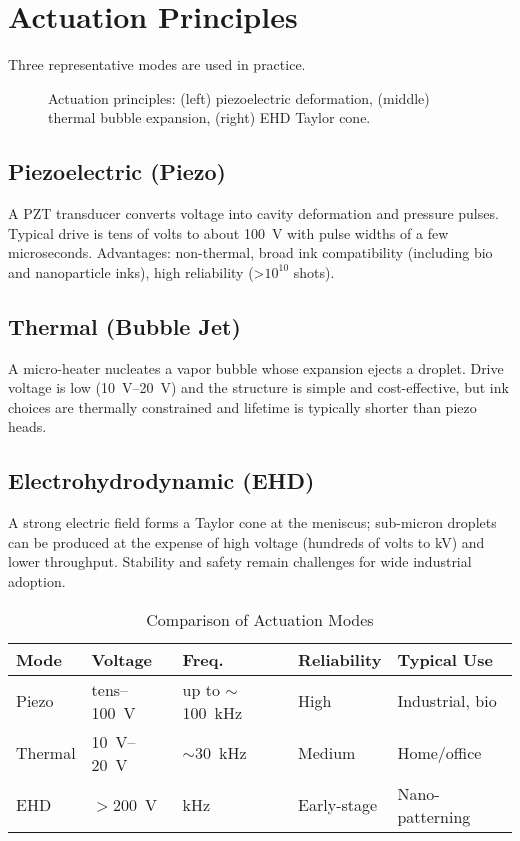 \documentclass[conference]{IEEEtran}
\begin{document}
\section{Actuation Principles}
Three representative modes are used in practice.

\begin{figure}[!t]
  \centering
  
  \caption{Actuation principles: (left) piezoelectric deformation, (middle) thermal bubble expansion, (right) EHD Taylor cone.}
  \label{fig:actuation_modes}
\end{figure}

\subsection{Piezoelectric (Piezo)}
A PZT transducer converts voltage into cavity deformation and pressure pulses. Typical drive is tens of volts to about \SI{100}{V} with pulse widths of a few microseconds. Advantages: non-thermal, broad ink compatibility (including bio and nanoparticle inks), high reliability (>$10^{10}$ shots).

\subsection{Thermal (Bubble Jet)}
A micro-heater nucleates a vapor bubble whose expansion ejects a droplet. Drive voltage is low (\SIrange{10}{20}{V}) and the structure is simple and cost-effective, but ink choices are thermally constrained and lifetime is typically shorter than piezo heads.

\subsection{Electrohydrodynamic (EHD)}
A strong electric field forms a Taylor cone at the meniscus; sub-micron droplets can be produced at the expense of high voltage (hundreds of volts to kV) and lower throughput. Stability and safety remain challenges for wide industrial adoption.

\begin{table}[!t]
\caption{Comparison of Actuation Modes}
\label{tab:actuation}
\centering
\begin{tabular}{@{}lllll@{}}
\toprule
Mode & Voltage & Freq. & Reliability & Typical Use \\
\midrule
Piezo & tens--\SI{100}{V} & up to $\sim$\SI{100}{kHz} & High & Industrial, bio \\
Thermal & \SIrange{10}{20}{V} & $\sim$\SI{30}{kHz} & Medium & Home/office \\
EHD & $>$\SI{200}{V} & kHz & Early-stage & Nano-patterning \\
\bottomrule
\end{tabular}
\end{table}
\end{document}
